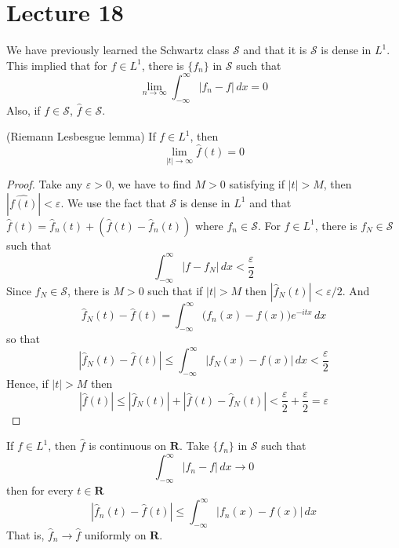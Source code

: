 \section{Lecture 18}
\begin{recall}
We have previously learned the Schwartz class $\mathcal{S}$ and that it is $\mathcal{S}$ is dense in $L^{1}$. This implied that for $f\in L^{1}$, there is $\{f_{n}\}$ in $\mathcal{S}$ such that 
\[\lim _{n\rightarrow \infty }\int _{-\infty }^{\infty }|f_{n}-f|\,dx=0\]
Also, if $f\in \mathcal{S}$, $\hat{f}\in \mathcal{S}$.
\end{recall}
\vspace{2ex}
\begin{thm}
(Riemann Lesbesgue lemma) If $f\in L^{1}$, then 
\[\lim _{|t|\rightarrow \infty }\hat{f}(t)=0\]
\end{thm}
\vspace{2ex}
\begin{proof}
Take any $\varepsilon >0$, we have to find $M>0$ satisfying if $|t|>M$, then $|\hat{f(t)}|<\varepsilon $. We use the fact that $\mathcal{S}$ is dense in $L^{1}$ and that $\hat{f}(t)=\hat{f}_{n}(t)+(\hat{f}(t)-\hat{f}_{n}(t))$ where $f_{n}\in \mathcal{S}$. For $f\in L^{1}$, there is $f_{N}\in \mathcal{S}$ such that 
\[\int ^{\infty }_{-\infty }|f-f_{N}|\,dx<\dfrac{\varepsilon }{2}\]
Since $\hat{f}_{N}\in \mathcal{S}$, there is $M>0$ such that if $|t|>M$ then $|\hat{f}_{N}(t)|<\varepsilon /2$. And 
\[\hat{f}_{N}(t)-\hat{f}(t)=\int _{-\infty }^{\infty }\Big(f_{n}(x)-f(x)\Big)e^{-itx}\,dx\]
so that 
\[|\hat{f}_{N}(t)-\hat{f}(t)|\leq \int ^{\infty }_{-\infty }|f_{N}(x)-f(x)|\,dx<\dfrac{\varepsilon }{2}\]
Hence, if $|t|>M$ then 
\[|\hat{f}(t)|\leq |\hat{f}_{N}(t)|+|\hat{f}(t)-\hat{f}_{N}(t)|<\dfrac{\varepsilon }{2}+\dfrac{\varepsilon }{2}=\varepsilon \]
\end{proof}
\vspace{2ex}
\begin{cor}
If $f\in L^{1}$, then $\hat{f}$ is continuous on ${\bm R}$. Take $\{f_{n}\}$ in $\mathcal{S}$ such that 
\[\int _{-\infty }^{\infty }|f_{n}-f|\,dx\rightarrow 0\]
then for every $t\in {\bm R}$
\[|\hat{f}_{n}(t)-\hat{f}(t)|\leq \int ^{\infty }_{-\infty }|f_{n}(x)-f(x)|\,dx\]
That is, $\hat{f}_{n}\rightarrow \hat{f}$ uniformly on ${\bm R}$.
\end{cor}
\vspace{2ex}
